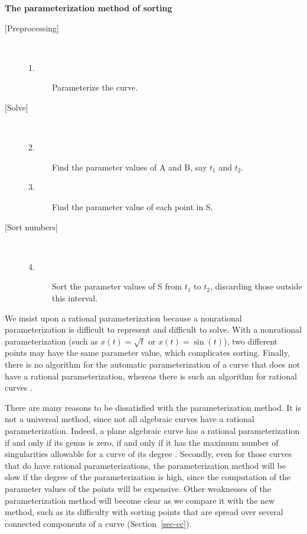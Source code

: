 \clearpage

\begin{center}{\bf The parameterization method of sorting}\end{center}
\begin{description}
\item[{[Preprocessing]}] \ \ \ 
\begin{description}
\item[1.] Parameterize the curve.
\end{description}
%
\item[{[Solve]}] \ \ \ 
\begin{description}
\item[2.]
	Find the parameter values of A and B, say $t_{1}$ and $t_{2}$.
\item[3.]
	Find the parameter value of each point in S.
\end{description}
%
\item[{[Sort numbers]}] \ \ \ 
\begin{description}
\item[4.]
	Sort the parameter values of S from $t_{1}$ to $t_{2}$, discarding
	those outside this interval.
\end{description}
\end{description}
%
We insist upon a rational parameterization because a nonrational 
parameterization is difficult to represent and difficult to solve. 
With a nonrational parameterization (such as $x(t) = \sqrt{t}$ or 
$x(t) = \sin(t)$),
two different points may have the same parameter value, which complicates sorting.
Finally, there is no algorithm for the automatic parameterization of a curve 
that does not have a rational parameterization, whereas there is such an algorithm
for rational curves \cite{abba3}.

There are many reasons to be dissatisfied with the parameterization method.
It is not a universal method, since not all algebraic curves have a 
rational parameterization.
Indeed, a plane algebraic curve has a rational parameterization if and only if its
genus is zero, if and only if it has the maximum number of singularities 
allowable for a curve of its degree \cite{walker}.  
Secondly, even for those curves that do have rational parameterizations, 
the parameterization method will be slow if the degree of the parameterization 
is high, since the computation of the parameter values of the points will 
be expensive.
Other weaknesses of the parameterization method will become clear as we compare
it with the new method, such as its difficulty with sorting points that are
spread over several connected components of a curve (Section~\ref{sec-cc}).

